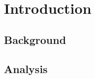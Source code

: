 \documentclass[titlepage]{article}
\begin{document}

\printnomenclature[3cm]

\clearpage
{}

\newpage

\section{Introduction}

\subsection{Background}
\subsection{Analysis}

\newpage



\end{document}
